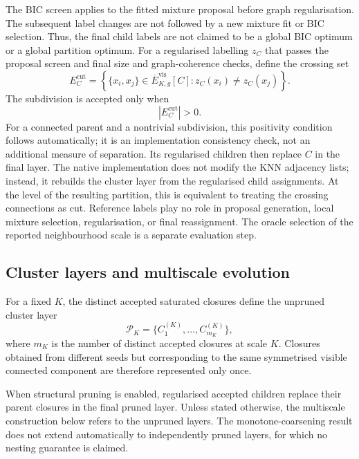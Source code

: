 \documentclass[pdflatex,sn-basic,Numbered]{sn-jnl}
\newcommand{\calP}{\mathcal{P}}
\begin{document}
The BIC screen applies to the fitted mixture proposal before graph
regularisation. The subsequent label changes are not followed by a new mixture
fit or BIC selection. Thus, the final child labels are not claimed to be a global
BIC optimum or a global partition optimum. For a regularised labelling $z_C$
that passes the proposal screen and final size and graph-coherence checks,
define the crossing set
\begin{equation}
E_C^{\mathrm{cut}}
=
\left\{
\{x_i,x_j\}\in\overline E_{K,g}^{\mathrm{vis}}[C]:
z_C(x_i)\neq z_C(x_j)
\right\}.
\label{eq:pruning_cut}
\end{equation}
The subdivision is accepted only when
\begin{equation}
|E_C^{\mathrm{cut}}|>0.
\end{equation}
For a connected parent and a nontrivial subdivision, this positivity
condition follows automatically; it is an implementation consistency check,
not an additional measure of separation. Its regularised children then
replace $C$ in the final layer. The native
implementation does not modify the KNN adjacency lists; instead, it rebuilds
the cluster layer from the regularised child assignments. At the level of the
resulting partition, this is equivalent to treating the crossing connections
as cut. Reference labels play no role in proposal generation, local mixture
selection, regularisation, or final reassignment. The oracle selection of the
reported neighbourhood scale is a separate evaluation step.

\subsection{Cluster layers and multiscale evolution}
\label{sec:layers}

For a fixed $K$, the distinct accepted saturated closures define the
unpruned cluster layer
\begin{equation}
\calP_K=
\{C_1^{(K)},\ldots,C_{m_K}^{(K)}\},
\end{equation}
where $m_K$ is the number of distinct accepted closures at scale $K$.
Closures obtained from different seeds but corresponding to the same
symmetrised visible connected component are therefore represented only once.

When structural pruning is enabled, regularised accepted children replace
their parent closures in the final pruned layer. Unless stated otherwise,
the multiscale construction below refers to the unpruned layers. The
monotone-coarsening result does not extend automatically to independently
pruned layers, for which no nesting guarantee is claimed.
\end{document}
